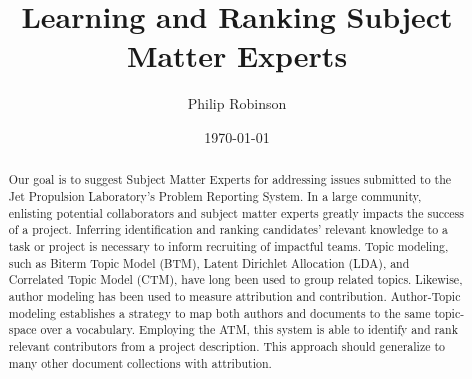 \documentclass{article}
\title{Learning and Ranking Subject Matter Experts}
\date{\today}
\author{Philip Robinson}
\affil{NASA: Jet Propulsion Laboratory}
\begin{document}
\maketitle

\begin{abstract}
  Our goal is to suggest Subject Matter Experts for addressing issues
  submitted to the Jet Propulsion Laboratory's Problem Reporting System.
  In a large community, enlisting potential collaborators and subject matter experts
  greatly impacts the success of a project. Inferring identification and ranking
  candidates' relevant knowledge to a task or project is necessary to inform recruiting
  of impactful teams\cite{Minto2007}.
  Topic modeling, such as Biterm Topic Model (BTM)\cite{Yan2013,Chen2015}, Latent Dirichlet Allocation (LDA),
  and Correlated Topic Model (CTM), have long been used to group related topics\cite{Alghamdi2015}. Likewise,
  author modeling has been used to measure attribution\cite{Rexha2018} and
  contribution\cite{AldebeiHJ016}. Author-Topic modeling establishes a strategy to
  map both authors and documents to the same topic-space over a vocabulary\cite{Rosen-Zvi2004}.
  Employing the ATM, this system is able to identify and rank relevant contributors
  from a project description. This approach should generalize to many other document collections
  with attribution.
\end{abstract}


{}

\end{document}

